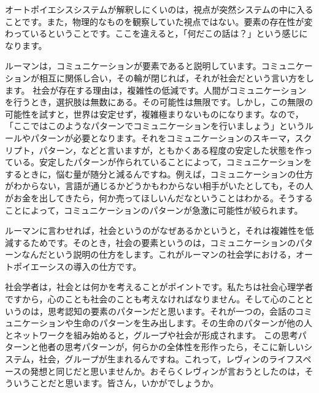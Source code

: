 \documentclass{ltjsbook}
\begin{document}
オートポイエシスシステムが解釈しにくいのは，視点が突然システムの中に入ることです。また，物理的なものを観察していた視点ではない。要素の存在性が変わっているということです。ここを違えると，「何だこの話は？」という感じになります。


ルーマンは，コミュニケーションが要素であると説明しています。コミュニケーションが相互に関係し合い，その輪が閉じれば，それが社会だという言い方をします。
社会が存在する理由は，複雑性の低減です。人間がコミュニケーションを行うとき，選択肢は無数にある。その可能性は無限です。しかし，この無限の可能性を試すと，世界は安定せず，複雑極まりないものになります。なので，「ここではこのようなパターンでコミュニケーションを行いましょう」というルールやパターンが必要となります。それをコミュニケーションのスキーマ，スクリプト，パターン，などと言いますが，ともかくある程度の安定した状態を作っている。安定したパターンが作られていることによって，コミュニケーションをするときに，悩む量が随分と減るんですね。例えば，コミュニケーションの仕方がわからない，言語が通じるかどうかもわからない相手がいたとしても，その人がお金を出してきたら，何か売ってほしいんだなということはわかる。そうすることによって，コミュニケーションのパターンが急激に可能性が絞られます。

ルーマンに言わせれば，社会というのがなぜあるかというと，それは複雑性を低減するためです。そのとき，社会の要素というのは，コミュニケーションのパターンなんだという説明の仕方をします。これがルーマンの社会学における，オートポイエーシスの導入の仕方です。

社会学者は，社会とは何かを考えることがポイントです。私たちは社会心理学者ですから，心のことも社会のことも考えなければなりません。そして心のことというのは，思考認知の要素のパターンだと思います。それが一つの，会話のコミュニケーションや生命のパターンを生み出します。その生命のパターンが他の人とネットワークを組み始めると，グループや社会が形成されます。
この思考パターンと他者の思考パターンが，何らかの全体性を形作ったら，そこに新しいシステム，社会，グループが生まれるんですね。これって，レヴィンのライフスペースの発想と同じだと思いませんか。おそらくレヴィンが言おうとしたのは，そういうことだと思います。皆さん，いかがでしょうか。
\end{document}
